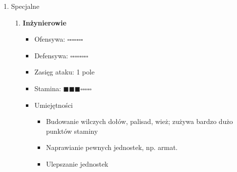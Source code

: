 \documentclass[oneside]{lmdEN}%
\begin{document}
\begin{enumerate}
    \item Specjalne
          \begin{enumerate}
              \item \textbf{Inżynierowie}
                    \begin{itemize}
                        \item Ofensywa: $\square\square\square\square\square\square\square$
                        \item Defensywa: $\square\square\square\square\square\square\square\square$
                        \item Zasięg ataku: 1 pole
                        \item Stamina: $\blacksquare\blacksquare\blacksquare\square\square\square\square\square$
                        \item Umiejętności
                              \begin{itemize}
                                  \item Budowanie wilczych dołów, palisad, wież; zużywa bardzo dużo punktów staminy
                                  \item Naprawianie pewnych jednostek, np. armat.
                                  \item Ulepszanie jednostek
                              \end{itemize}
                    \end{itemize}
          \end{enumerate}

    
\end{enumerate}


\end{document}

